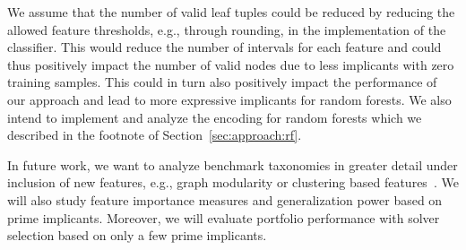 \documentclass[a4paper, USenglish, cleveref, autoref, thm-restate]{lipics-v2021}
\theoremstyle{definition}
\begin{document}
We assume that the number of valid leaf tuples could be reduced by reducing the allowed feature thresholds, e.g., through rounding, in the implementation of the classifier. 
This would reduce the number of intervals for each feature and could thus positively impact the number of valid nodes due to less implicants with zero training samples. 
This could in turn also positively impact the performance of our approach and lead to more expressive implicants for random forests. 
We also intend to implement and analyze the encoding for random forests which we described in the footnote of Section~\ref{sec:approach:rf}. 

In future work, we want to analyze benchmark taxonomies in greater detail under inclusion of new features, e.g., graph modularity or clustering based features~\cite{Ansotegui:2019:Community,Li:2021:Hierarchical}. 
We will also study feature importance measures and generalization power based on prime implicants. 
Moreover, we will evaluate portfolio performance with solver selection based on only a few prime implicants. 


\end{document}
